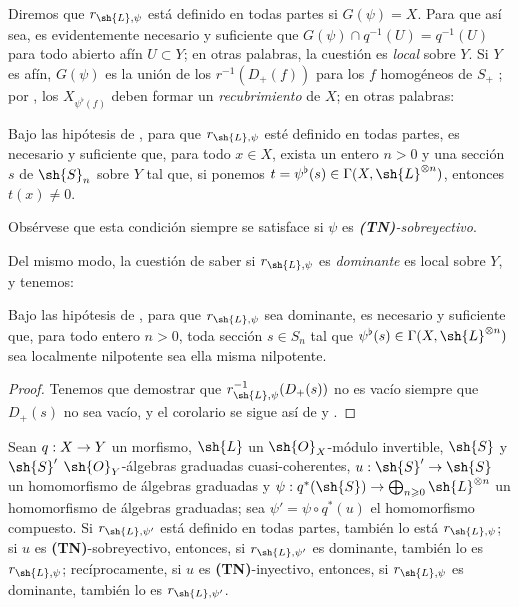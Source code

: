 \documentclass[oneside,10pt]{amsart}
\makeatletter
\renewcommand{\geq}{\geqslant}
\newcommand{\ega@arrow}[2]{\mathchoice{#1}{#2}{#2}{#2}}
\renewcommand{\to}{\ega@arrow{\longrightarrow}{\rightarrow}}
\newcommand{\oldpage}[2][]{\marginnote{\normalfont\footnotesize\textbf{#1}~|~#2}\ignorespaces}
\let\EGAOriginalLabel\label
\renewcommand{\label}[1]{\phantomsection\EGAOriginalLabel{#1}}
\makeatother
\begin{document}
Diremos que $r_{\sh{L},\psi}$ está definido en todas partes si $G(\psi)=X$.
Para que así sea, es evidentemente necesario y suficiente que $G(\psi)\cap q^{-1}(U)=q^{-1}(U)$ para todo abierto afín $U\subset Y$;
en otras palabras, la cuestión es \emph{local} sobre $Y$.
Si $Y$ es afín, $G(\psi)$ es la unión de los $r^{-1}(D_+(f))$ para los $f$ homogéneos de $S_+$ ;
por , los $X_{\psi^\flat(f)}$ deben formar un \emph{recubrimiento} de $X$;
en otras palabras:

\begin{corollary}[3.7.4]
\label{II.3.7.4}
Bajo las hipótesis de , para que $r_{\sh{L},\psi}$ esté definido en todas partes, es necesario y suficiente que, para todo $x\in X$, exista un entero $n>0$ y una sección $s$ de $\sh{S}_n$ sobre $Y$ tal que, si ponemos $t=\psi^\flat(s)\in\Gamma(X,\sh{L}^{\otimes n})$, entonces $t(x)\neq0$.
\end{corollary}

\oldpage[II]{67}
Obsérvese que esta condición siempre se satisface si $\psi$ es \emph{\textbf{(TN)}-sobreyectivo}.

Del mismo modo, la cuestión de saber si $r_{\sh{L},\psi}$ es \emph{dominante} es local sobre $Y$, y tenemos:

\begin{corollary}[3.7.5]
\label{II.3.7.5}
Bajo las hipótesis de , para que $r_{\sh{L},\psi}$ sea dominante, es necesario y suficiente que, para todo entero $n>0$, toda sección $s\in S_n$ tal que $\psi^\flat(s)\in\Gamma(X,\sh{L}^{\otimes n})$ sea localmente nilpotente sea ella misma nilpotente.
\end{corollary}

\begin{proof}
Tenemos que demostrar que $r_{\sh{L},\psi}^{-1}(D_+(s))$ no es vacío siempre que $D_+(s)$ no sea vacío, y el corolario se sigue así de  y .
\end{proof}

\begin{proposition}[3.7.6]
\label{II.3.7.6}
Sean $q:X\to Y$ un morfismo, $\sh{L}$ un $\sh{O}_X$-módulo invertible, $\sh{S}$ y $\sh{S}'$ $\sh{O}_Y$-álgebras graduadas cuasi-coherentes, $u:\sh{S}'\to\sh{S}$ un homomorfismo de álgebras graduadas y $\psi:q^*(\sh{S})\to\bigoplus_{n\geq0}\sh{L}^{\otimes n}$ un homomorfismo de álgebras graduadas;
sea $\psi'=\psi\circ q^*(u)$ el homomorfismo compuesto.
Si $r_{\sh{L},\psi'}$ está definido en todas partes, también lo está $r_{\sh{L},\psi}$;
si $u$ es \textup{\textbf{(TN)}}-sobreyectivo, entonces, si $r_{\sh{L},\psi'}$ es dominante, también lo es $r_{\sh{L},\psi}$;
recíprocamente, si $u$ es \textup{\textbf{(TN)}}-inyectivo, entonces, si $r_{\sh{L},\psi}$ es dominante, también lo es $r_{\sh{L},\psi'}$.
\end{proposition}
\end{document}
